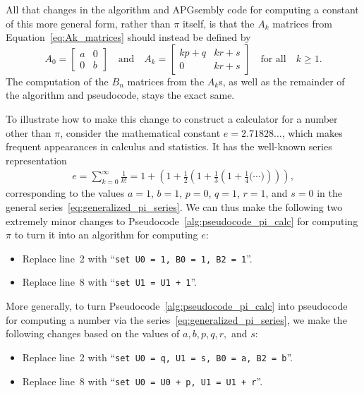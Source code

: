 All that changes in the algorithm and APGsembly code for computing a constant of this more general form, rather than $\pi$ itself, is that the $A_k$ matrices from Equation~\eqref{eq:Ak_matrices} should instead be defined by
\[
A_0 = \begin{bmatrix}
a & 0 \\ 0 & b
\end{bmatrix} \quad \text{and} \quad A_k = \begin{bmatrix}
kp+q & kr+s \\ 0 & kr+s
\end{bmatrix} \quad \text{for all} \quad k \geq 1.
\]
The computation of the $B_n$ matrices from the $A_k$s, as well as the remainder of the algorithm and pseudocode, stays the exact same.

To illustrate how to make this change to construct a calculator for a number other than $\pi$, consider the mathematical constant $e = 2.71828\ldots$, which makes frequent appearances in calculus and statistics. It has the well-known series representation
\begin{align}\label{eq:e_series}
	e = \sum_{k=0}^\infty \frac{1}{k!} = 1 + \left(1 + \frac{1}{2}\left(1 + \frac{1}{3}\left(1 + \frac{1}{4}\Big( \cdots \Big)\right)\right)\right),
\end{align}
corresponding to the values $a = 1$, $b = 1$, $p = 0$, $q = 1$, $r = 1$, and $s = 0$ in the general series~\eqref{eq:generalized_pi_series}. We can thus make the following two extremely minor changes to Pseudocode~\ref{alg:pseudocode_pi_calc} for computing $\pi$ to turn it into an algorithm for computing $e$:\smallskip

\begin{itemize}
	\item Replace line~2 with ``\texttt{set U0 = 1, B0 = 1, B2 = 1}''.\smallskip
	
	\item Replace line~8 with ``\texttt{set U1 = U1 + 1}''.\smallskip
\end{itemize}

More generally, to turn Pseudocode~\ref{alg:pseudocode_pi_calc} into pseudocode for computing a number via the series~\eqref{eq:generalized_pi_series}, we make the following changes based on the values of $a,b,p,q,r,$ and $s$:\smallskip

\begin{itemize}
	\item Replace line~2 with ``\texttt{set U0 = q, U1 = s, B0 = a, B2 = b}''.\smallskip
	
	\item Replace line~8 with ``\texttt{set U0 = U0 + p, U1 = U1 + r}''.\smallskip
\end{itemize}

